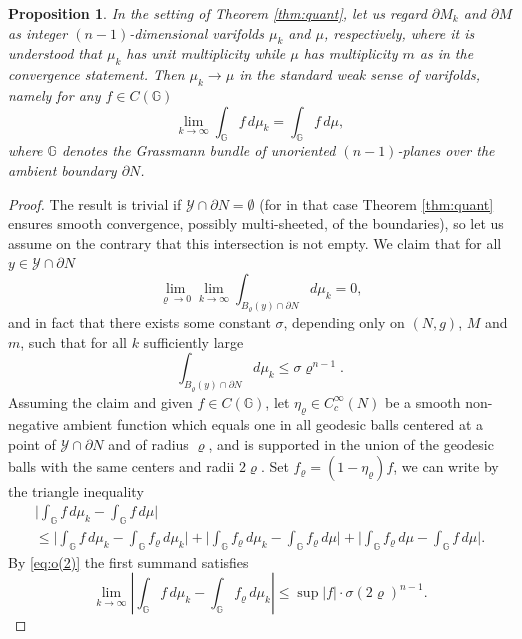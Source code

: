 \documentclass[JEP,XML,SOM,Unicode]{cedram}
\let\mathcal\mathscr
\newcounter{cas}
\newtheorem{prop}[thm]{Proposition}
\theoremstyle{definition}
\begin{document}
\begin{prop}\label{prop:boundaryconv}
In the setting of Theorem \ref{thm:quant}, let us regard $\partial M_k$ and $\partial M$ as integer $(n-1)$-dimensional varifolds $\mu_k$ and $\mu$, respectively, where it is understood that $\mu_k$ has unit multiplicity while $\mu$ has multiplicity $m$ as in the convergence statement. Then $\mu_k \to \mu$ in the standard weak sense of varifolds, namely for any $f\in C(\mathbb{G})$
\[
\lim_{k\to\infty}\int_{\mathbb{G}} f\,d\mu_k =\int_{\mathbb{G}} f\,d\mu,
\]
where $\mathbb{G}$ denotes the Grassmann bundle of unoriented $(n-1)$-planes over the ambient boundary $\partial N$.
\end{prop}

\begin{proof}
The result is trivial if $\mathcal{Y}\cap\partial N=\emptyset$ (for in that case Theorem \ref{thm:quant} ensures smooth convergence, possibly multi-sheeted, of the boundaries), so let us assume on the contrary that this intersection is not empty.
We claim that for all $y\in \mathcal{Y}\cap \partial N$
\begin{equation*}
\lim_{\varrho \to 0} \lim_{k\to\infty}\int_{B_\varrho (y)\cap \partial N} d\mu_k = 0,
\end{equation*}
and in fact that there exists some constant $\sigma$, depending only on $(N,g)$, $M$ and $m$, such that for all $k$ sufficiently large
\begin{equation}\label{eq:o(2)}
\int_{B_\varrho (y)\cap \partial N} d\mu_k \leq \sigma \varrho^{n-1}.
\end{equation}
Assuming the claim and given $f\in C(\mathbb{G})$, let $\eta_\varrho \in C^{\infty}_c(N)$ be a smooth non-negative ambient function which equals one in all geodesic balls centered at a point of $\mathcal{Y}\cap \partial N$ and of radius $\varrho$, and is supported in the union of the geodesic balls with the same centers and radii $2\varrho$. Set $f_\varrho = (1-\eta_\varrho)f$, we can write by the triangle inequality
\begin{multline*}
\biggl| \int_{\mathbb{G}} f\,d\mu_k -\int_{\mathbb{G}} f\,d\mu \biggr|\\\leq \biggl| \int_{\mathbb{G}} f\,d\mu_k -\int_{\mathbb{G}} f_\varrho\,d\mu_k \biggr|
+ \biggl| \int_{\mathbb{G}} f_\varrho\,d\mu_k -\int_{\mathbb{G}} f_\varrho\,d\mu \biggr|
+ \biggr| \int_{\mathbb{G}} f_\varrho\,d\mu -\int_{\mathbb{G}} f\,d\mu \biggr|.
\end{multline*}
By \eqref{eq:o(2)} the first summand satisfies
\[\lim_{k\to \infty} \left| \int_{\mathbb{G}} f\,d\mu_k -\int_{\mathbb{G}} f_\varrho\,d\mu_k \right| \leq \sup |f|\cdot \sigma(2\varrho)^{n-1}.
\]
\end{proof}
\end{document}
